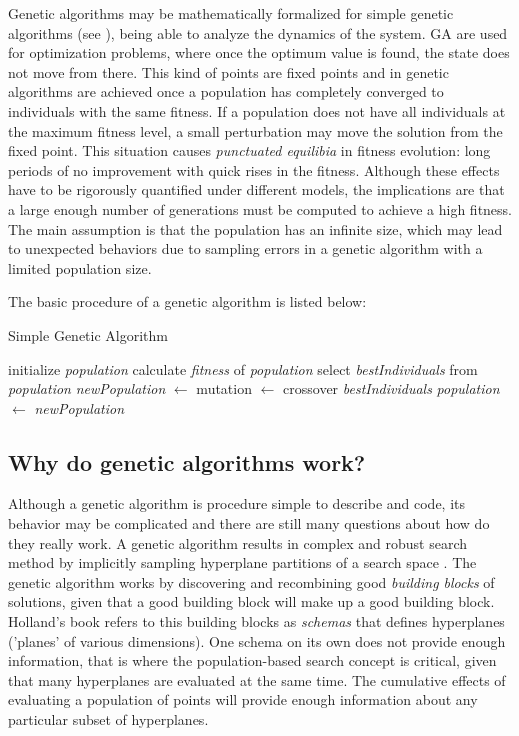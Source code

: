     \newpage
    
    Genetic algorithms may be mathematically formalized for simple genetic algorithms (see \cite{goldberg2006genetic} \cite{vose1991punctuated} \cite{whitley1993executable}), being able to analyze the dynamics of the system. GA are used for optimization problems, where once the optimum value is found, the state does not move from there. This kind of points are fixed points and in genetic algorithms are achieved once a population has completely converged to individuals with the same fitness. If a population does not have all individuals at the maximum fitness level, a small perturbation may move the solution from the fixed point. This situation causes \textit{punctuated equilibia} in fitness evolution: long periods of no improvement with quick rises in the fitness. Although these effects have to be rigorously quantified under different models, the implications are that a large enough number of generations must be computed to achieve a high fitness. The main assumption is that the population has an infinite size, which may lead to unexpected behaviors due to sampling errors in a genetic algorithm with a limited population size. 
    
    The basic procedure of a genetic algorithm is listed below:
    \begin{algorithm}
        \caption{Simple Genetic Algorithm}\label{alg:simpleGApseudoCode}
        \begin{algorithmic}[1]
        \State initialize \textit{population}
            \State calculate \textit{fitness} of \textit{population}
            \State select \textit{bestIndividuals} from \textit{population}
            \State \textit{newPopulation} $\leftarrow$ mutation $\leftarrow$ crossover \textit{bestIndividuals}
            \State \textit{population} $\leftarrow$ \textit{newPopulation}
        \EndWhile
        \end{algorithmic}
    \end{algorithm}

\subsection{Why do genetic algorithms work?}

    Although a genetic algorithm is procedure simple to describe and code, its behavior may be complicated and there are still many questions about how do they really work. A genetic algorithm results in complex and robust search method by implicitly sampling hyperplane partitions of a search space \cite{whitley1994genetic}.
    The genetic algorithm works by discovering and recombining good \textit{building blocks} of solutions, given that a good building block will make up a good building block.
    Holland's book \cite{john1992holland} refers to this building blocks as \textit{schemas} that defines hyperplanes ('planes' of various dimensions). One schema on its own does not provide enough information, that is where the population-based search concept is critical, given that many hyperplanes are evaluated at the same time. The cumulative effects of evaluating a population of points will provide enough information about any particular subset of hyperplanes.

